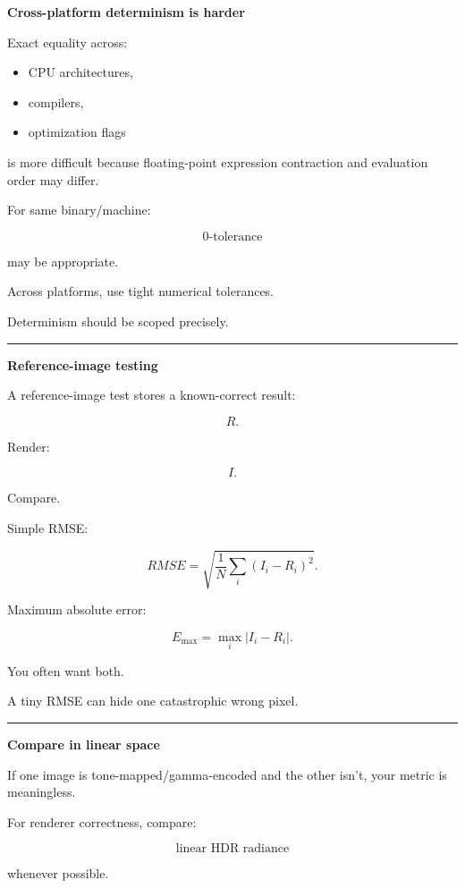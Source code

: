 \textbf{Cross-platform determinism is harder}

Exact equality across:

\begin{itemize}
\tightlist
\item
  CPU architectures,
\item
  compilers,
\item
  optimization flags
\end{itemize}

is more difficult because floating-point expression contraction and evaluation order may differ.

For same binary/machine:

\[
0\text{-tolerance}
\]

may be appropriate.

Across platforms, use tight numerical tolerances.

Determinism should be scoped precisely.

\begin{center}\rule{0.5\linewidth}{0.5pt}\end{center}

\textbf{Reference-image testing}

A reference-image test stores a known-correct result:

\[
R.
\]

Render:

\[
I.
\]

Compare.

Simple RMSE:

\[
\boxed{
RMSE
=
\sqrt{
\frac1N
\sum_i
(I_i-R_i)^2
}.
}
\]

Maximum absolute error:

\[
\boxed{
E_{\max}
=
\max_i|I_i-R_i|.
}
\]

You often want both.

A tiny RMSE can hide one catastrophic wrong pixel.

\begin{center}\rule{0.5\linewidth}{0.5pt}\end{center}

\textbf{Compare in linear space}

If one image is tone-mapped/gamma-encoded and the other isn't, your metric is meaningless.

For renderer correctness, compare:

\[
\boxed{\text{linear HDR radiance}}
\]

whenever possible.

